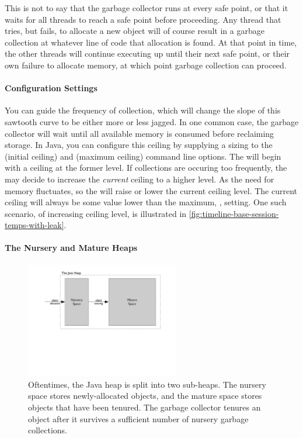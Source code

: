This is not to say that the garbage collector runs at every safe point, or that
it waits for all threads to reach a safe point before proceeding. Any thread that
tries, but fails, to allocate a new object will of course result in a garbage
collection at whatever line of code that allocation is found. At that point in
time, the other threads will continue executing up until their next safe point,
or their own failure to allocate memory, at which point garbage collection can
proceed.

\paragraph{Configuration Settings}
You can guide the frequency of collection, which will change the slope of this
sawtooth curve to be either more or less jagged. In one common case, the garbage
collector will wait until all available memory is consumed before reclaiming
storage.  In Java, you can configure this ceiling by supplying a sizing to the
 (initial ceiling) and
 (maximum ceiling) command line options. 
 The \jre will begin with a ceiling at the
former level. If collections are occuring too frequently, the \jre may decide to
increase the \emph{current} ceiling to a higher level. As the need for memory
fluctuates, so the \jre will raise or lower the current ceiling level. The
current ceiling will always be some value lower than the maximum, ,
setting. One such scenario, of increasing ceiling level, is illustrated in
\autoref{fig:timeline-base-session-temps-with-leak}.

\paragraph{The Nursery and Mature Heaps}

\begin{figure}
\centering
	\includegraphics[width=0.6\textwidth]{part2/Figures/lifetime/nursery}
	\caption{Oftentimes, the Java heap is split into two sub-heaps. The nursery
	space stores newly-allocated objects, and the mature space stores objects that
	have been tenured. The garbage collector tenures an object after it
	survives a sufficient number of nursery garbage collections.}
	\label{fig:nursery-and-mature}
\end{figure}

